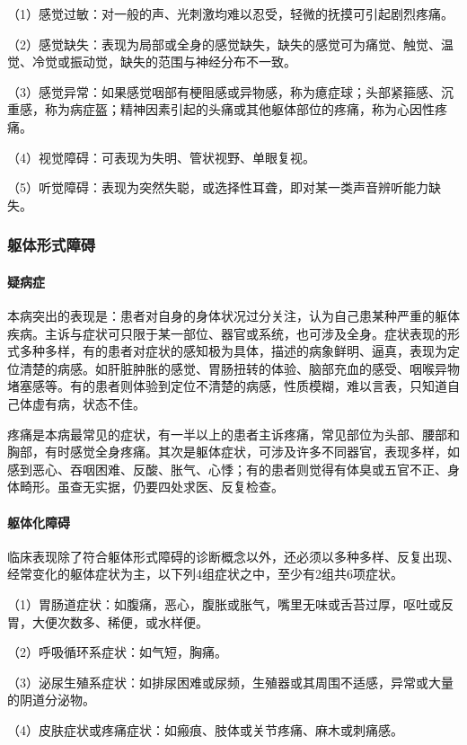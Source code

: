 （1）感觉过敏：对一般的声、光刺激均难以忍受，轻微的抚摸可引起剧烈疼痛。

（2）感觉缺失：表现为局部或全身的感觉缺失，缺失的感觉可为痛觉、触觉、温觉、冷觉或振动觉，缺失的范围与神经分布不一致。

（3）感觉异常：如果感觉咽部有梗阻感或异物感，称为癔症球；头部紧箍感、沉重感，称为病症盔；精神因素引起的头痛或其他躯体部位的疼痛，称为心因性疼痛。

（4）视觉障碍：可表现为失明、管状视野、单眼复视。

（5）听觉障碍：表现为突然失聪，或选择性耳聋，即对某一类声音辨听能力缺失。

\subsubsection{躯体形式障碍}
\paragraph{疑病症}

本病突出的表现是：患者对自身的身体状况过分关注，认为自己患某种严重的躯体疾病。主诉与症状可只限于某一部位、器官或系统，也可涉及全身。症状表现的形式多种多样，有的患者对症状的感知极为具体，描述的病象鲜明、逼真，表现为定位清楚的病感。如肝脏肿胀的感觉、胃肠扭转的体验、脑部充血的感受、咽喉异物堵塞感等。有的患者则体验到定位不清楚的病感，性质模糊，难以言表，只知道自己体虚有病，状态不佳。

疼痛是本病最常见的症状，有一半以上的患者主诉疼痛，常见部位为头部、腰部和胸部，有时感觉全身疼痛。其次是躯体症状，可涉及许多不同器官，表现多样，如感到恶心、吞咽困难、反酸、胀气、心悸；有的患者则觉得有体臭或五官不正、身体畸形。虽查无实据，仍要四处求医、反复检查。
\paragraph{躯体化障碍}

临床表现除了符合躯体形式障碍的诊断概念以外，还必须以多种多样、反复出现、经常变化的躯体症状为主，以下列4组症状之中，至少有2组共6项症状。

（1）胃肠道症状：如腹痛，恶心，腹胀或胀气，嘴里无味或舌苔过厚，呕吐或反胃，大便次数多、稀便，或水样便。

（2）呼吸循环系症状：如气短，胸痛。

（3）泌尿生殖系症状：如排尿困难或尿频，生殖器或其周围不适感，异常或大量的阴道分泌物。

（4）皮肤症状或疼痛症状：如瘢痕、肢体或关节疼痛、麻木或刺痛感。

